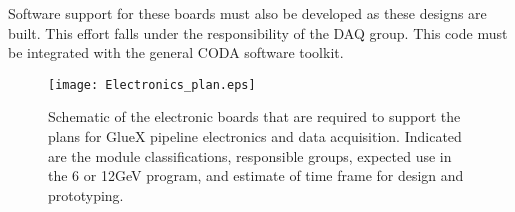 \documentclass[10pt]{article}
\begin{document}
Software support for these boards must also be developed as these designs are built. This effort falls under the 
responsibility of the DAQ group. This code must be integrated with the general CODA software toolkit.


\begin{figure}[p]
\begin{center}
\texttt{[image: Electronics\_plan.eps]}
\caption{Schematic of the electronic boards that are required to support
the plans for GlueX pipeline electronics and data acquisition.
Indicated are the module classifications, responsible groups,
expected use in the 6 or 12GeV program, and estimate of time frame for design
and prototyping.
\label{fig:plan}}
\end{center}
\end{figure}
\end{document}
